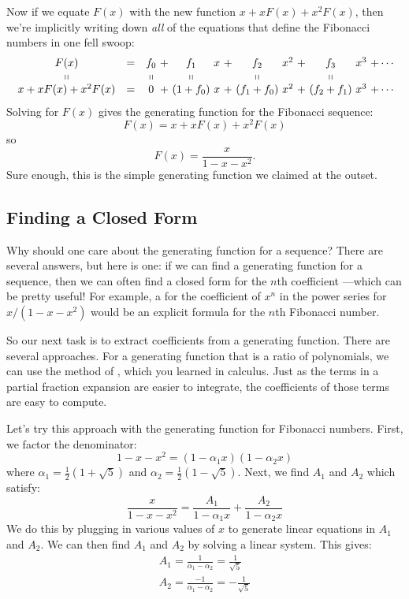 Now if we equate $F(x)$ with the new function $x + x F(x) + x^2 F(x)$,
then we're implicitly writing down \textit{all} of the equations that
define the Fibonacci numbers in one fell swoop:
%
\[
\begin{array}{ccc@{\ }c@{\ }c@{\ }c@{\ }c@{\ }c@{\ }c@{\ }c@{\ }c@{\ }c@{\ }c@{\ }c@{\ }c}
F(x)
    & = & f_0 & + & f_1 & x & + & f_2 & x^2 & + & f_3 & x^3 & + \cdots \\
\shortparallel && \shortparallel && \shortparallel &&& \shortparallel &&& \shortparallel\\
x + x F(x) + x^2 F(x)
    & = & 0 & + & (1 + f_0) & x & + & (f_1 + f_0) & x^2 & + & (f_2 + f_1) & x^3 & + \cdots
\end{array}
\]
%
Solving for $F(x)$ gives the generating function for the Fibonacci
sequence:
%
\[
F(x)  = x + x F(x) + x^2 F(x)
\]
so
\[
F(x) = \frac{x}{1 - x - x^2}.
\]
%
Sure enough, this is the simple generating function we claimed at the
outset.

\subsection{Finding a Closed Form}

Why should one care about the generating function for a sequence?  There
are several answers, but here is one: if we can find a generating function
for a sequence, then we can often find a closed form for the $n$th
coefficient ---which can be pretty useful!  For example, a  for the coefficient of $x^n$ in the power series for $x / (1 - x -
x^2)$ would be an explicit formula for the $n$th Fibonacci number.

So our next task is to extract coefficients from a generating function.
There are several approaches.  For a generating function that is a ratio
of polynomials, we can use the method of , which
you learned in calculus.  Just as the terms in a partial fraction
expansion are easier to integrate, the coefficients of those terms are
easy to compute.

Let's try this approach with the generating function for Fibonacci
numbers.  First, we factor the denominator:
%
\[
1 - x - x^2 = (1 - \alpha_1 x) (1 - \alpha_2 x)
\]
%
where $\alpha_1 = \frac{1}{2}(1 + \sqrt{5})$ and $\alpha_2 =
\frac{1}{2}(1 - \sqrt{5})$.  Next, we find $A_1$ and $A_2$ which
satisfy:
%
\[
\frac{x}{1 - x - x^2} =
        \frac{A_1}{1 - \alpha_1 x} + \frac{A_2}{1 - \alpha_2 x}
\]
%
We do this by plugging in various values of $x$ to generate linear
equations in $A_1$ and $A_2$.  We can then find $A_1$ and $A_2$ by
solving a linear system.  This gives:
%
\begin{gather*}
A_1 = \frac{1}{\alpha_1 - \alpha_2} = \frac{1}{\sqrt{5}} \\
A_2 = \frac{-1}{\alpha_1 - \alpha_2} = -\frac{1}{\sqrt{5}}
\end{gather*}

